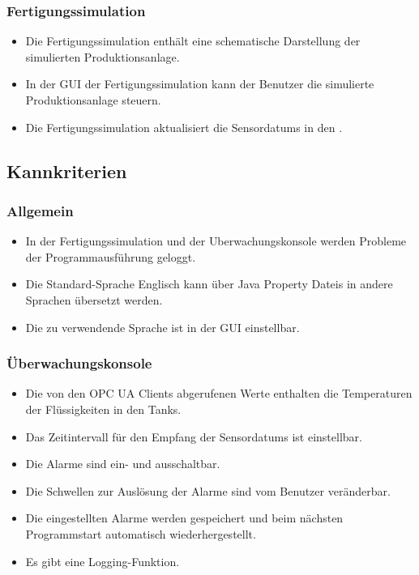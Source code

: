 \documentclass[parskip=full]{scrartcl}
\begin{document}
\subsubsection{Fertigungssimulation}
\begin{itemize}
  \item Die \gls{Fertigungssimulation} enth\"alt eine schematische Darstellung der simulierten \gls{Produktionsanlage}.
  \item In der \gls{GUI} der \gls{Fertigungssimulation} kann der Benutzer die simulierte \gls{Produktionsanlage} steuern.
  \item Die \gls{Fertigungssimulation} aktualisiert die \glspl{Sensordatum} in den .
\end{itemize}

\subsection{Kannkriterien}
\subsubsection{Allgemein}
\begin{itemize}
  \item In der \gls{Fertigungssimulation} und der \gls{Uberwachungskonsole} werden Probleme der Programmausf\"uhrung geloggt.
  \item Die Standard-Sprache Englisch kann über \glspl{Java Property Datei} in andere Sprachen übersetzt werden.
  \item Die zu verwendende Sprache ist in der \gls{GUI} einstellbar.
\end{itemize}

\subsubsection{Überwachungskonsole}
\begin{itemize}
  \item Die von den \glspl{OPC UA Client} abgerufenen Werte enthalten die Temperaturen der Flüssigkeiten in den Tanks.
  \item Das Zeitintervall für den Empfang der \glspl{Sensordatum} ist einstellbar.
  \item Die Alarme sind ein- und ausschaltbar.
  \item Die Schwellen zur Ausl\"osung der Alarme sind vom Benutzer veränderbar.
  \item Die eingestellten Alarme werden gespeichert und beim n\"achsten Programmstart automatisch wiederhergestellt.
  \item Es gibt eine Logging-Funktion.
\end{itemize}
\end{document}

